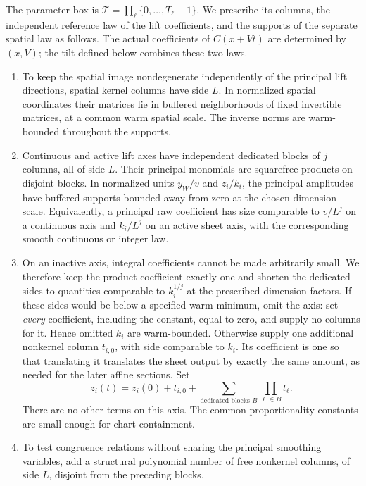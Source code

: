 The parameter box is
$\mathcal T=\prod_\ell\{0,\ldots,T_\ell-1\}$.
We prescribe its columns, the independent reference law of the
lift coefficients, and the supports of the separate spatial law
as follows. The actual coefficients of $C(x+Vt)$ are determined
by $(x,V)$; the tilt defined below combines these two laws.
\begin{enumerate}
\item To keep the spatial image nondegenerate independently of the
principal lift directions, spatial kernel columns have side $L$.
In normalized spatial coordinates their matrices lie in buffered neighborhoods of fixed
invertible matrices, at a common warm spatial scale.  The inverse
norms are warm-bounded throughout the supports.
\item Continuous and active lift axes have independent dedicated
blocks of $j$ columns, all of side $L$.  Their principal monomials
are squarefree products on disjoint blocks.  In normalized units
$y_W/v$ and $z_i/k_i$, the principal amplitudes have buffered
supports bounded away from zero at the chosen dimension scale.
Equivalently, a principal raw coefficient has size comparable to
$v/L^j$ on a continuous axis and $k_i/L^j$ on an active sheet
axis, with the corresponding smooth continuous or integer law.
\item On an inactive axis, integral coefficients cannot be made
arbitrarily small. We therefore keep the product coefficient
exactly one and shorten the dedicated sides to quantities comparable
to $k_i^{1/j}$ at the prescribed dimension factors.  If these sides would be below a specified
warm minimum, omit the axis: set \emph{every} coefficient, including
the constant, equal to zero, and supply no columns for it.  Hence
omitted $k_i$ are warm-bounded.  Otherwise supply one additional
nonkernel column $t_{i,0}$, with side comparable to $k_i$.
Its coefficient is one so that translating it translates the
sheet output by exactly the same amount, as needed for the
later affine sections. Set
\begin{equation}\label{ap:path:inactive-polynomial}
 z_i(t)=z_i(0)+t_{i,0}
                 +\sum_{\text{dedicated blocks }B}\prod_{\ell\in B}t_\ell.
\end{equation}
There are no other terms on this axis.  The common proportionality
constants are small enough for chart containment.
\item To test congruence relations without sharing the principal
smoothing variables, add a structural polynomial number of free
nonkernel columns, of side $L$, disjoint from the preceding blocks.

\end{enumerate}
